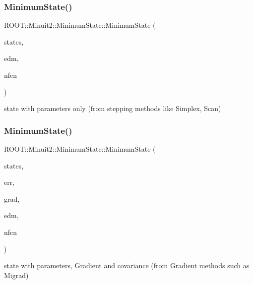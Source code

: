 \subsubsection{\texorpdfstring{MinimumState()}{MinimumState()}\hspace{0.1cm}{\footnotesize\ttfamily [6/8]}}
{\footnotesize\ttfamily R\+O\+O\+T\+::\+Minuit2\+::\+Minimum\+State\+::\+Minimum\+State (\begin{DoxyParamCaption}\item[{const \mbox{\hyperlink{classROOT_1_1Minuit2_1_1MinimumParameters}{Minimum\+Parameters}} \&}]{states,  }\item[{double}]{edm,  }\item[{int}]{nfcn }\end{DoxyParamCaption})\hspace{0.3cm}{\ttfamily [inline]}}

state with parameters only (from stepping methods like Simplex, Scan) \mbox{\label{classROOT_1_1Minuit2_1_1MinimumState_a35c2e0098d60a9caeee9e2c60093b5a9}} 
\subsubsection{\texorpdfstring{MinimumState()}{MinimumState()}\hspace{0.1cm}{\footnotesize\ttfamily [7/8]}}
{\footnotesize\ttfamily R\+O\+O\+T\+::\+Minuit2\+::\+Minimum\+State\+::\+Minimum\+State (\begin{DoxyParamCaption}\item[{const \mbox{\hyperlink{classROOT_1_1Minuit2_1_1MinimumParameters}{Minimum\+Parameters}} \&}]{states,  }\item[{const \mbox{\hyperlink{classROOT_1_1Minuit2_1_1MinimumError}{Minimum\+Error}} \&}]{err,  }\item[{const \mbox{\hyperlink{classROOT_1_1Minuit2_1_1FunctionGradient}{Function\+Gradient}} \&}]{grad,  }\item[{double}]{edm,  }\item[{int}]{nfcn }\end{DoxyParamCaption})\hspace{0.3cm}{\ttfamily [inline]}}

state with parameters, Gradient and covariance (from Gradient methods such as Migrad) \mbox{\label{classROOT_1_1Minuit2_1_1MinimumState_a30666c7113d7e8c199d4de1b1a44ee03}} 

